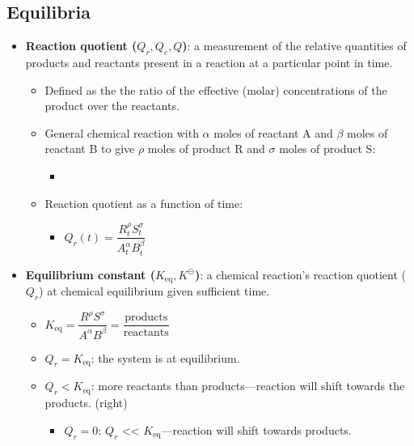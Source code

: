 \documentclass[12pt,a4paper]{article}
\begin{document}
\subsection{Equilibria}
\begin{itemize}
    \item \textbf{Reaction quotient (\(Q_r, Q_c, Q\))}: a measurement of the relative quantities of products and reactants present in a reaction at a particular point in time.
        \begin{itemize}
            \item Defined as the the ratio of the effective (molar) concentrations of the product over the reactants.
            \item General chemical reaction with $\alpha$ moles of reactant A and $\beta$ moles of reactant B to give $\rho$ moles of product R and $\sigma$ moles of product S:
                \begin{itemize}
                    \item {}
                \end{itemize}
            \item Reaction quotient as a function of time:
                \begin{itemize}
                    \item \(Q_r(t)=\dfrac{R_t^\rho S_t^\sigma}{A_t^\alpha B_t^\beta}\)
                \end{itemize}
        \end{itemize}
    \item \textbf{Equilibrium constant (\(K_{\text{eq}}, K^\circleddash\))}:  a chemical reaction's reaction quotient (\(Q_r\)) at chemical equilibrium given sufficient time.
        \begin{itemize}
            \item \(K_{\text{eq}} =\dfrac{R^\rho S^\sigma}{A^\alpha B^\beta}= \dfrac{\text{products}}{\text{reactants}}\) 
            \item \(Q_r = K_{\text{eq}}\): the system is at equilibrium.
            \item {\color{neg}\(Q_r < K_{\text{eq}}\)}: more reactants than products---reaction will shift towards the {\color{neg}products}. (right)
                \begin{itemize}
                    \item \(Q_r = 0\): \(Q_r\) << \(K_{\text{eq}}\)---reaction will shift towards products. 
                \end{itemize}

\end{itemize}
\end{itemize}
\end{document}
